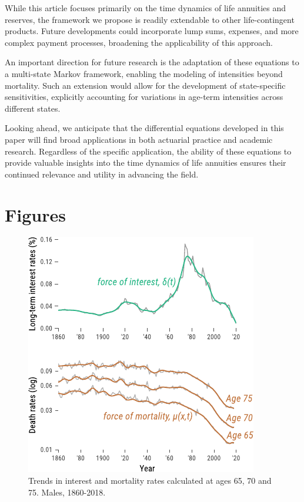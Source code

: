 \documentclass[12pt]{article}
\begin{document}
While this article focuses primarily on the time dynamics of life annuities and reserves, the framework we propose is readily extendable to other life-contingent products. Future developments could incorporate lump sums, expenses, and more complex payment processes, broadening the applicability of this approach.

An important direction for future research is the adaptation of these equations to a multi-state Markov framework, enabling the modeling of intensities beyond mortality. Such an extension would allow for the development of state-specific sensitivities, explicitly accounting for variations in age-term intensities across different states.

Looking ahead, we anticipate that the differential equations developed in this paper will find broad applications in both actuarial practice and academic research. Regardless of the specific application, the ability of these equations to provide valuable insights into the time dynamics of life annuities ensures their continued relevance and utility in advancing the field.

\newpage


%
%



\newpage

\FloatBarrier
\section{Figures}

\begin{figure}[!ht]
	\centering
	\includegraphics[width=0.5\linewidth]{Fig/deltamu}
	\caption{{Trends in interest and mortality rates calculated at ages 65, 70 and 75. Males, 1860-2018.}}
	\label{fig:Fig1}
\end{figure}
\end{document}
